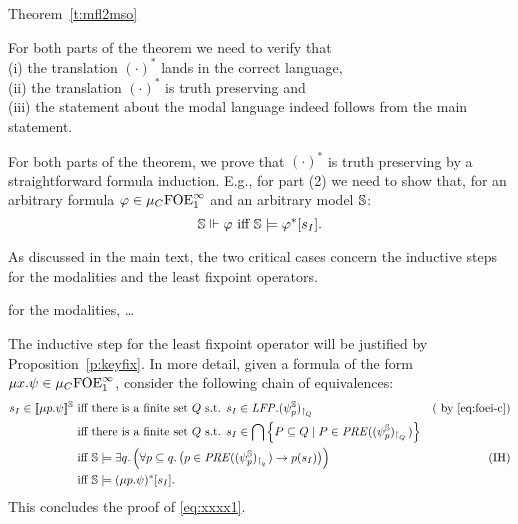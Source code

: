 \begin{proofof}{Theorem~\ref{t:mfl2mso}}
\btbs
\item
For both parts of the theorem we need to verify that 
\\ (i) the translation $(\cdot)^{*}$ lands in the correct language, 
\\ (ii) the translation $(\cdot)^{*}$ is truth preserving and
\\ (iii) the statement about the modal language indeed follows from the 
   main statement.
\etbs

For both parts of the theorem, we prove that $(\cdot)^{*}$ is truth preserving 
by a straightforward formula induction.
E.g., for part (2) we need to show that, for an arbitrary formula $\varphi\in
\mu_{C}\mathrm{FOE}^{\infty}_1$ and an arbitrary model $\mathbb{S}$:
\begin{equation}
\label{eq:xxxx1}
\model \mmodels \phi \text{ iff } \model \models \phi^{*}[s_{I}].
\end{equation}

As discussed in the main text, the two critical cases concern the inductive 
steps for the modalities and the least fixpoint operators.

\btbs
\item
for the modalities, \ldots
\etbs

The inductive step for the least fixpoint operator will be justified by 
Proposition~\ref{p:keyfix}.
In more detail, given a formula of the form $\mu x. \psi \in\mu_{C}\mathrm{FOE}^{\infty}_1$,
consider the following chain of equivalences:
\begin{align*}
s_{I} \in \mng{\mu p.\psi}^{\bbS} \text{ iff } &
   \text{there is a finite set $Q$ s.t. } 
   s_{I} \in \LFP. (\psi^{\model}_{p})_{\rst{Q}} 
   & \text{( by \eqref{eq:foei-c})}
\\ \text{ iff } &
\text{there is a finite set $Q$ s.t. } 
   s_{I} \in \bigcap \Big\{ P \subseteq Q \mid P \in 
   \PRE((\psi^{\model}_{p})_{\rst{Q}})\Big\} 
\\ \text{ iff } & 
    \bbS \models \exists q.\, \Big(\forall p \subseteq q.\,
       \big(p \in \PRE((\psi^{\model}_{p})_{\rst{q}}) \to p(s_{I})\big)
       \Big)
   & (\text{IH})
\\ \text{ iff } & 
    \bbS \models (\mu p. \psi)^{*}[s_{I}].
\end{align*}
This concludes the proof of \eqref{eq:xxxx1}.
\end{proofof}

